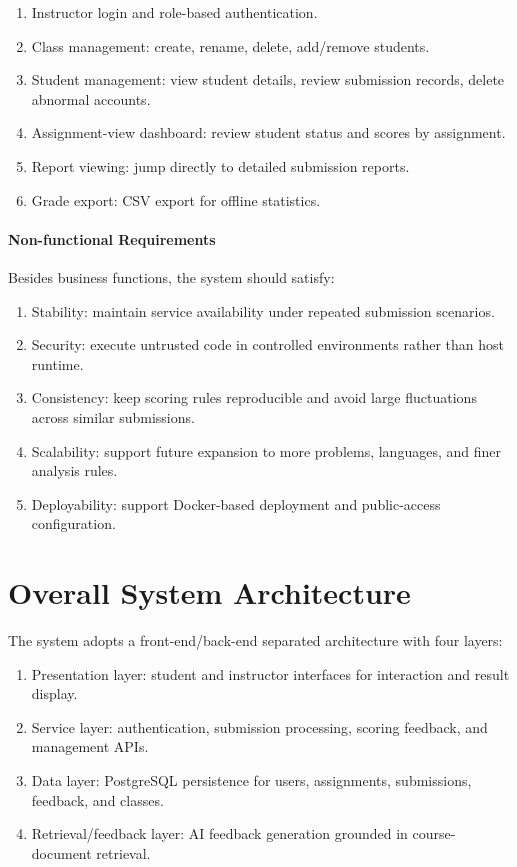 \begin{enumerate}
\item Instructor login and role-based authentication.
\item Class management: create, rename, delete, add/remove students.
\item Student management: view student details, review submission records, delete abnormal accounts.
\item Assignment-view dashboard: review student status and scores by assignment.
\item Report viewing: jump directly to detailed submission reports.
\item Grade export: CSV export for offline statistics.
\end{enumerate}


\paragraph{Non-functional Requirements}
Besides business functions, the system should satisfy:

\begin{enumerate}
\item Stability: maintain service availability under repeated submission scenarios.
\item Security: execute untrusted code in controlled environments rather than host runtime.
\item Consistency: keep scoring rules reproducible and avoid large fluctuations across similar submissions.
\item Scalability: support future expansion to more problems, languages, and finer analysis rules.
\item Deployability: support Docker-based deployment and public-access configuration.
\end{enumerate}


\section{Overall System Architecture}

The system adopts a front-end/back-end separated architecture with four layers:

\begin{enumerate}
\item Presentation layer: student and instructor interfaces for interaction and result display.
\item Service layer: authentication, submission processing, scoring feedback, and management APIs.
\item Data layer: PostgreSQL persistence for users, assignments, submissions, feedback, and classes.
\item Retrieval/feedback layer: AI feedback generation grounded in course-document retrieval.
\end{enumerate}


